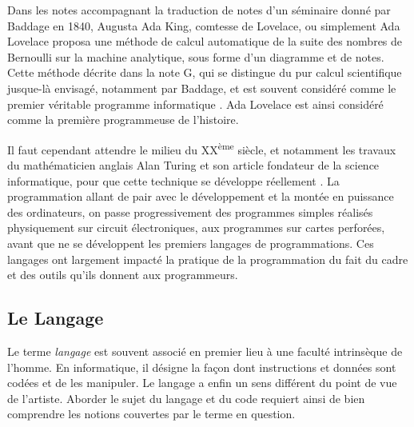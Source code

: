 \documentclass[12pt]{article} %
\newcommand{\ts}{\textsuperscript} %
\begin{document}
Dans les notes accompagnant la traduction de notes d'un séminaire donné par Baddage en 1840, Augusta Ada King, comtesse de Lovelace, ou simplement Ada Lovelace proposa une méthode de calcul automatique de la suite des nombres de Bernoulli sur la machine analytique, sous forme d'un diagramme et de notes. Cette méthode décrite dans la note G, qui se distingue du pur calcul scientifique jusque-là envisagé, notamment par Baddage, et est souvent considéré comme le premier véritable programme informatique \cite{JKrysa}. Ada Lovelace est ainsi considéré comme la première programmeuse de l'histoire. 

Il faut cependant attendre le milieu du XX\ts{ème} siècle, et notamment les travaux du mathématicien anglais Alan Turing et son article fondateur de la science informatique, pour que cette technique se développe réellement . La programmation allant de pair avec le développement et la montée en puissance des ordinateurs, on passe progressivement des programmes simples réalisés physiquement sur circuit électroniques, aux programmes sur cartes perforées, avant que ne se développent les premiers langages de programmations. Ces langages ont largement impacté la pratique de la programmation du fait du cadre et des outils qu'ils donnent aux programmeurs.


\subsection{Le Langage}

Le terme \textit{langage} est souvent associé en premier lieu à une faculté intrinsèque de l'homme. En informatique, il désigne la façon dont instructions et données sont codées et de les manipuler. Le langage a enfin un sens différent du point de vue de l'artiste. Aborder le sujet du langage et du code requiert ainsi de bien comprendre les notions couvertes par le terme en question. 
\end{document}
